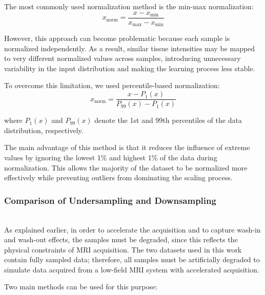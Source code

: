 \documentclass[12pt]{article}
\begin{document}
The most commonly used normalization method is the min-max normalization:
\[
x_{\mathrm{norm}} = \frac{x - x_{\min}}{x_{\max} - x_{\min}}
\]

However, this approach can become problematic because each sample is normalized independently.
As a result, similar tissue intensities may be mapped to very different normalized values across samples, introducing unnecessary variability in the input distribution and making the learning process less stable.
\vspace{0.5cm}

To overcome this limitation, we used percentile-based normalization:
\[
x_{\mathrm{norm}} = \frac{x - P_1(x)}{P_{99}(x) - P_1(x)}
\]

where $P_1(x)$ and $P_{99}(x)$ denote the 1st and 99th percentiles of the data distribution, respectively.
\vspace{0.5cm}

The main advantage of this method is that it reduces the influence of extreme values by ignoring the lowest 1\% and highest 1\% of the data during normalization. 
This allows the majority of the dataset to be normalized more effectively while preventing outliers from dominating the scaling process.

\subsubsection{Comparison of Undersampling and Downsampling}
\mbox{}\\
As explained earlier, in order to accelerate the acquisition and to capture wash-in and wash-out effects, the samples must be degraded, since this reflects the physical constraints of MRI acquisition. 
The two datasets used in this work contain fully sampled data; therefore, all samples must be artificially degraded to simulate data acquired from a low-field MRI system with accelerated acquisition.
\vspace{0.5cm}

Two main methods can be used for this purpose:
\end{document}
